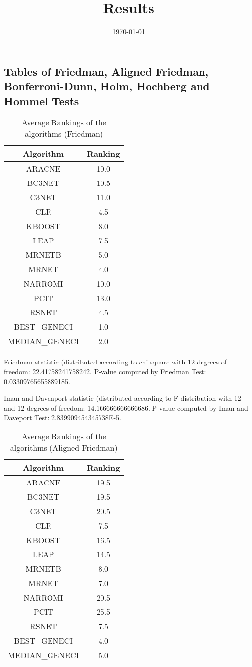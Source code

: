 \documentclass[a4paper,10pt]{article}
\title{Results}
\author{}
\date{\today}
\begin{document}
\begin{landscape}
\oddsidemargin 0in \topmargin 0in\maketitle
\section{Tables of Friedman, Aligned Friedman, Bonferroni-Dunn, Holm, Hochberg and Hommel Tests}
\begin{table}[!htp]
\centering
\caption{Average Rankings of the algorithms (Friedman)
}\begin{tabular}{c|c}
Algorithm&Ranking\\
\hline
ARACNE&10.0\\
BC3NET&10.5\\
C3NET&11.0\\
CLR&4.5\\
KBOOST&8.0\\
LEAP&7.5\\
MRNETB&5.0\\
MRNET&4.0\\
NARROMI&10.0\\
PCIT&13.0\\
RSNET&4.5\\
BEST_GENECI&1.0\\
MEDIAN_GENECI&2.0\\
\end{tabular}
\end{table}


Friedman statistic (distributed according to chi-square with 12 degrees of freedom: 22.41758241758242. 
P-value computed by Friedman Test: 0.03309765655889185.\newline

Iman and Davenport statistic (distributed according to F-distribution with 12 and 12 degrees of freedom: 14.166666666666686. 
P-value computed by Iman and Daveport Test: 2.839909454345738E-5.\newline


\newpage

\begin{table}[!htp]
\centering
\caption{Average Rankings of the algorithms (Aligned Friedman)
}\begin{tabular}{c|c}
Algorithm&Ranking\\
\hline
ARACNE&19.5\\
BC3NET&19.5\\
C3NET&20.5\\
CLR&7.5\\
KBOOST&16.5\\
LEAP&14.5\\
MRNETB&8.0\\
MRNET&7.0\\
NARROMI&20.5\\
PCIT&25.5\\
RSNET&7.5\\
BEST_GENECI&4.0\\
MEDIAN_GENECI&5.0\\
\end{tabular}
\end{table}



\end{landscape}
\end{document}
